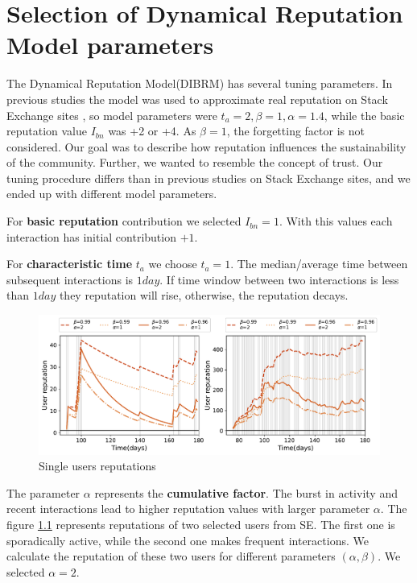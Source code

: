 \chapter{Selection of Dynamical Reputation Model parameters}

The Dynamical Reputation Model(DIBRM) has several tuning parameters. In previous studies the model \cite{melnikovDynamicInteractionBasedReputation2018,yashkina2020} was used to approximate real reputation on Stack Exchange sites \cite{yashkina2020}, so model parameters were $t_a =2, \beta = 1, \alpha = 1.4$, while the basic reputation value $I_{bn}$ was +2 or +4. As $\beta=1$, the forgetting factor is not considered. Our goal was to describe how reputation influences the sustainability of the community. Further, we wanted to resemble the concept of trust. Our tuning procedure differs than in previous studies on Stack Exchange sites, and we ended up with different model parameters. 

For \textbf{basic reputation} contribution we selected $I_{bn}=1$. With this values each interaction has initial contribution $+1$. 

For \textbf{characteristic time} $t_a$ we choose $t_a=1$. The median/average time between subsequent interactions is $1 day$. If time window between two interactions is less than $1 day$ they reputation will rise, otherwise, the reputation decays.

\begin{figure}[h]
	\centering
	\includegraphics[width=0.8\linewidth]{figures/stackexchange/single_user_reputation.pdf}
	\caption{Single users reputations }
	\label{fig:singleuser}
\end{figure} 

The {parameter $\alpha$} represents the \textbf{cumulative factor}. The burst in activity and recent interactions lead to higher reputation values with larger parameter $\alpha$. The figure \ref{fig:singleuser} represents reputations of two selected users from SE. The first one is sporadically active, while the second one makes frequent interactions. We calculate the reputation of these two users for different parameters $(\alpha, \beta)$. We selected $\alpha=2$.  



